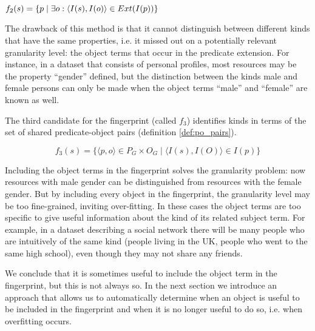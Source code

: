 \begin{definition}
  \label{def:predicate}
  $f_2(s) = \\
  \{ p \mid \exists o: \langle I(s), I(o) \rangle \in Ext(I(p)) \}$
\end{definition}

The drawback of this method is that it cannot distinguish between
 different kinds that have the same properties,
 i.e. it missed out on a potentially relevant granularity level:
 the object terms that occur in the predicate extension.
For instance, in a dataset that consists of personal profiles,
 most resources may be the property ``gender'' defined,
 but the distinction between the kinds male and female persons
 can only be made when the object terms ``male'' and ``female''
 are known as well.

The third candidate for the fingerprint (called $f_3$)
 identifies kinds in terms of the set of shared predicate-object pairs
 (definition \ref{def:po_pairs}).

\begin{definition}
  \label{def:po_pairs}
  \[
    f_3(s)
  =
    \{
      \langle p, o \rangle \in P_G \times O_G
    \mid
      \langle I(s), I(O) \rangle \in I(p)
    \}
  \]
\end{definition}

Including the object terms in the fingerprint solves the granularity problem:
 now
  resources with male gender
 can be distinguished from
  resources with the female gender.
But by including every object in the fingerprint,
 the granularity level may be too fine-grained,
 inviting over-fitting.
In these cases the object terms are too specific to give
 useful information about the kind of its related subject term.
For example, in a dataset describing a social network
 there will be many people who are intuitively of the same kind
 (people living in the UK, people who went to the same high school),
 even though they may not share any friends.

We conclude that it is sometimes useful to include the object term
 in the fingerprint, but this is not always so.
In the next section we introduce an approach that allows us
 to automatically determine when an object is useful to be included
 in the fingerprint and when it is no longer useful to do so,
 i.e. when overfitting occurs.

